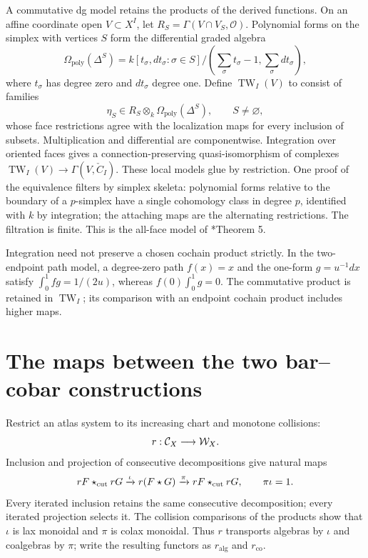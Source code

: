 A commutative dg model retains the products of the derived functions.
On an affine coordinate open $V\subset X^I$, let
$R_S=\Gamma(V\cap V_S,\mathcal O)$. Polynomial forms on the simplex
with vertices $S$ form the differential graded algebra
\[
 \Omega_{\mathrm{poly}}(\Delta^S)=
 k[t_\sigma,dt_\sigma:\sigma\in S]/
           (\textstyle\sum_\sigma t_\sigma-1,\sum_\sigma dt_\sigma),
\]
where $t_\sigma$ has degree zero and $dt_\sigma$ degree one.
Define $\operatorname{TW}_I(V)$ to consist of families
\[
 \eta_S\in R_S\otimes_k\Omega_{\mathrm{poly}}(\Delta^S),
 \qquad S\ne\varnothing,
\]
whose face restrictions agree with the localization maps for every
inclusion of subsets. Multiplication and differential are componentwise.
Integration over oriented faces gives a connection-preserving
quasi-isomorphism of complexes
$\operatorname{TW}_I(V)\to\Gamma(V,\check C_I)$. These local models
glue by restriction. One proof of the equivalence filters by simplex
skeleta: polynomial forms relative to the boundary of a $p$-simplex
have a single cohomology class in degree $p$, identified with $k$
by integration; the attaching maps are the alternating restrictions.
The filtration is finite. This is the all-face model of
\cite{cycuts:AKY}*{Theorem 5}.

Integration need not preserve a chosen cochain product strictly.
In the two-endpoint path model, a degree-zero path $f(x)=x$ and
the one-form $g=u^{-1}dx$ satisfy
$\int_0^1fg=1/(2u)$, whereas $f(0)\int_0^1g=0$.
The commutative product is retained in $\operatorname{TW}_I$;
its comparison with an endpoint cochain product includes higher maps.

\section{The maps between the two bar--cobar constructions}
\label{cycuts:sec:comparison}

Restrict an atlas system to its increasing chart and monotone collisions:
\[
 r:\mathcal C_X\longrightarrow\mathcal W_X.
\]
Inclusion and projection of consecutive decompositions give natural maps
\begin{equation}\label{cycuts:eq:lax-colax}
 rF\star_{\mathrm{cut}} rG\xrightarrow{\iota}r(F\star G)
                       \xrightarrow{\pi}rF\star_{\mathrm{cut}} rG,
 \qquad\pi\iota=1.
\end{equation}
Every iterated inclusion retains the same consecutive decomposition;
every iterated projection selects it. The collision comparisons of
the products show that $\iota$ is lax monoidal and $\pi$ is colax
monoidal. Thus $r$ transports algebras by $\iota$ and coalgebras
by $\pi$; write the resulting functors as $r_{\mathrm{alg}}$ and
$r_{\mathrm{co}}$.


